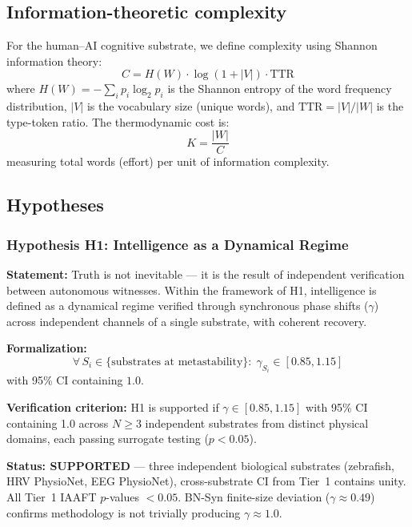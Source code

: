 \documentclass[11pt,a4paper,twocolumn]{article}
\begin{document}
\subsection{Information-theoretic complexity}

For the human--AI cognitive substrate, we define complexity using Shannon information theory:
\begin{equation}
C = H(W) \cdot \log(1 + |V|) \cdot \text{TTR}
\end{equation}
where $H(W) = -\sum_i p_i \log_2 p_i$ is the Shannon entropy of the word frequency distribution, $|V|$ is the vocabulary size (unique words), and $\text{TTR} = |V|/|W|$ is the type-token ratio. The thermodynamic cost is:
\begin{equation}
K = \frac{|W|}{C}
\end{equation}
measuring total words (effort) per unit of information complexity.

\subsection{Hypotheses}

\subsubsection{Hypothesis H1: Intelligence as a Dynamical Regime}

\textbf{Statement:} Truth is not inevitable --- it is the result of independent verification between autonomous witnesses. Within the framework of H1, intelligence is defined as a dynamical regime verified through synchronous phase shifts ($\gamma$) across independent channels of a single substrate, with coherent recovery.

\textbf{Formalization:}
\begin{equation}
\forall\, S_i \in \{\text{substrates at metastability}\}:\; \gamma_{S_i} \in [0.85, 1.15]
\end{equation}
with 95\% CI containing $1.0$.

\textbf{Verification criterion:} H1 is supported if $\gamma \in [0.85, 1.15]$ with 95\% CI containing 1.0 across $N \geq 3$ independent substrates from distinct physical domains, each passing surrogate testing ($p < 0.05$).

\textbf{Status: SUPPORTED} --- three independent biological substrates (zebrafish, HRV PhysioNet, EEG PhysioNet), cross-substrate CI from Tier~1 contains unity. All Tier~1 IAAFT $p$-values $< 0.05$. BN-Syn finite-size deviation ($\gamma \approx 0.49$) confirms methodology is not trivially producing $\gamma \approx 1.0$.
\end{document}
